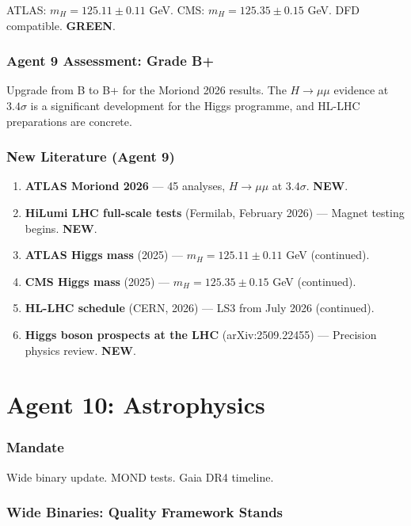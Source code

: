 \documentclass[11pt,a4paper]{article}
\newcommand{\GREEN}{\textcolor{dfdgreen}{\textbf{GREEN}}}
\newcommand{\NEW}{\textcolor{dfdblue}{\textbf{NEW}}}
\begin{document}
ATLAS: $m_H = 125.11 \pm 0.11$ GeV. CMS: $m_H = 125.35 \pm 0.15$ GeV. DFD compatible. \GREEN.

\section{Agent 9 Assessment: Grade B+}

Upgrade from B to B+ for the Moriond 2026 results. The $H \to \mu\mu$ evidence at $3.4\sigma$ is a significant development for the Higgs programme, and HL-LHC preparations are concrete.

\section{New Literature (Agent 9)}

\begin{enumerate}
\item \textbf{ATLAS Moriond 2026} --- 45 analyses, $H \to \mu\mu$ at $3.4\sigma$. \NEW.
\item \textbf{HiLumi LHC full-scale tests} (Fermilab, February 2026) --- Magnet testing begins. \NEW.
\item \textbf{ATLAS Higgs mass} (2025) --- $m_H = 125.11 \pm 0.11$ GeV (continued).
\item \textbf{CMS Higgs mass} (2025) --- $m_H = 125.35 \pm 0.15$ GeV (continued).
\item \textbf{HL-LHC schedule} (CERN, 2026) --- LS3 from July 2026 (continued).
\item \textbf{Higgs boson prospects at the LHC} (arXiv:2509.22455) --- Precision physics review. \NEW.
\end{enumerate}


\part{Agent 10: Astrophysics}
\label{part:agent10}

\section{Mandate}

Wide binary update. MOND tests. Gaia DR4 timeline.

\section{Wide Binaries: Quality Framework Stands}
\end{document}
